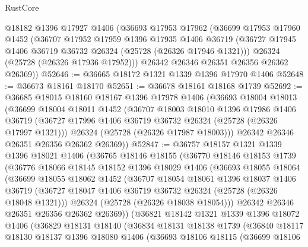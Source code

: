 \begin{lexlean}{RustCore}
\begin{coremodule}
    @18182
    @1396
    @17927
    @1406
    (@36693
      @17953
      @17962
      (@36699
        @17953
        @17960
        @1452
        (@36707
          @17952
          @17959
          @1396
          @17935
          @1406
          @36719
          (@36727 @17945 @1406 @36719 @36732 @26324 (@25728 (@26326 @17946 @1321)))
          @26324
          (@25728 (@26326 @17936 @17952)))
        @26342
        @26346
        @26351
        @26356
        @26362
        @26369))
@52646 := @36665 @18172 @1321 @1339 @1396 @17970 @1406
@52648 := @36673 @18161 @18170
@52651 := @36678 @18161 @18168 @1739
@52692 := @36685
    @18015
    @18160
    @18167
    @1396
    @17978
    @1406
    (@36693
      @18004
      @18013
      (@36699
        @18004
        @18011
        @1452
        (@36707
          @18003
          @18010
          @1396
          @17986
          @1406
          @36719
          (@36727 @17996 @1406 @36719 @36732 @26324 (@25728 (@26326 @17997 @1321)))
          @26324
          (@25728 (@26326 @17987 @18003)))
        @26342
        @26346
        @26351
        @26356
        @26362
        @26369))
@52847 := @36757
    @18157
    @1321
    @1339
    @1396
    @18021
    @1406
    (@36765
      @18146
      @18155
      (@36770
        @18146
        @18153
        @1739
        (@36776
          @18066
          @18145
          @18152
          @1396
          @18029
          @1406
          (@36693
            @18055
            @18064
            (@36699
              @18055
              @18062
              @1452
              (@36707
                @18054
                @18061
                @1396
                @18037
                @1406
                @36719
                (@36727 @18047 @1406 @36719 @36732 @26324 (@25728 (@26326 @18048 @1321)))
                @26324
                (@25728 (@26326 @18038 @18054)))
              @26342
              @26346
              @26351
              @26356
              @26362
              @26369))
          (@36821
            @18142
            @1321
            @1339
            @1396
            @18072
            @1406
            (@36829
              @18131
              @18140
              (@36834
                @18131
                @18138
                @1739
                (@36840
                  @18117
                  @18130
                  @18137
                  @1396
                  @18080
                  @1406
                  (@36693
                    @18106
                    @18115
                    (@36699
                      @18106

\end{coremodule}
\end{lexlean}
